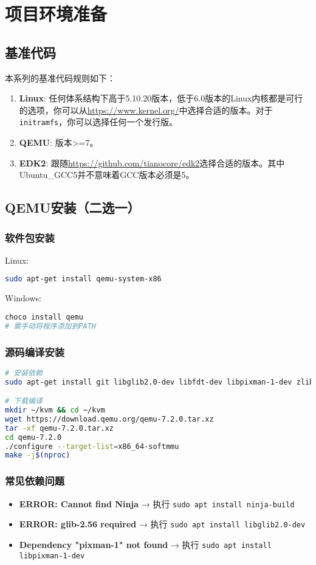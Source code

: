 \chapter{项目环境准备}

\section{基准代码}
本系列的基准代码规则如下：
\begin{enumerate}
    \item \textbf{Linux}: 任何体系结构下高于5.10.20版本，低于6.0版本的Linux内核都是可行的选项，你可以从\url{https://www.kernel.org/}中选择合适的版本。对于\texttt{initramfs}，你可以选择任何一个发行版。
    \item \textbf{QEMU}: 版本>=7。
    \item \textbf{EDK2}: 跟随\url{https://github.com/tianocore/edk2}选择合适的版本。其中Ubuntu\_GCC5并不意味着GCC版本必须是5。
\end{enumerate}
\section{QEMU安装（二选一）}
\subsection{软件包安装}
Linux:
\begin{lstlisting}[language=bash]
sudo apt-get install qemu-system-x86
\end{lstlisting}

Windows:
\begin{lstlisting}[language=bash]
choco install qemu
# 需手动将程序添加到PATH
\end{lstlisting}
\subsection{源码编译安装}
\begin{lstlisting}[language=bash]
# 安装依赖
sudo apt-get install git libglib2.0-dev libfdt-dev libpixman-1-dev zlib1g-dev ninja-build

# 下载编译
mkdir ~/kvm && cd ~/kvm
wget https://download.qemu.org/qemu-7.2.0.tar.xz
tar -xf qemu-7.2.0.tar.xz
cd qemu-7.2.0
./configure --target-list=x86_64-softmmu
make -j$(nproc)
\end{lstlisting}

\subsection{常见依赖问题}
\begin{itemize}
    \item \textbf{ERROR: Cannot find Ninja} → 执行 \texttt{sudo apt install ninja-build}
    \item \textbf{ERROR: glib-2.56 required} → 执行 \texttt{sudo apt install libglib2.0-dev}
    \item \textbf{Dependency "pixman-1" not found} → 执行 \texttt{sudo apt install libpixman-1-dev}
\end{itemize}

